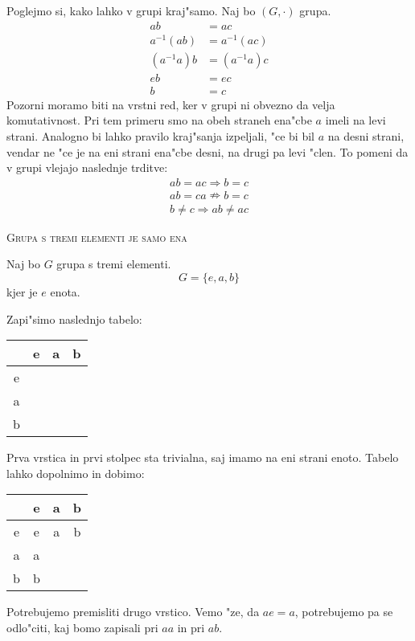Poglejmo si, kako lahko v grupi kraj"samo. Naj bo $(G, \cdot)$ grupa.
\begin{align*}
ab &= ac\\
a^{-1} (ab) &= a^{-1} (ac)\\
(a^{-1} a) b &= (a^{-1} a) c\\
eb &= ec \\
b &= c
\end{align*}
Pozorni moramo biti na vrstni red, ker v grupi ni obvezno da velja komutativnost. Pri tem primeru smo na obeh straneh ena"cbe $a$ imeli na levi strani. Analogno bi lahko pravilo kraj"sanja izpeljali, "ce bi bil $a$ na desni strani, vendar ne "ce je na eni strani ena"cbe desni, na drugi pa levi "clen. To pomeni da v grupi vlejajo naslednje trditve:
\begin{gather*}
ab = ac \Rightarrow b = c \\
ab = ca \nRightarrow b = c \\
b \neq c \Rightarrow ab \neq ac
\end{gather*}

\textsc{Grupa s tremi elementi je samo ena}

Naj bo $G$ grupa s tremi elementi.
\begin{equation*}
G = \{e, a, b\}
\end{equation*}
kjer je $e$ enota.

Zapi"simo naslednjo tabelo:
\begin{table}[!htbp]
	\centering
	\begin{tabular}{c|ccc}
		& e & a & b \\ \hline
		e &  &  & \\
		a &  &  &  \\
		b &  &  & 
	\end{tabular}
\end{table}

Prva vrstica in prvi stolpec sta trivialna, saj imamo na eni strani enoto. Tabelo lahko dopolnimo in dobimo:
\begin{table}[!htbp]
	\centering
	\begin{tabular}{c|ccc}
		& e & a & b \\ \hline
		e & e & a & b\\
		a & a &  &  \\
		b & b &  & 
	\end{tabular}
\end{table}

 Potrebujemo premisliti drugo vrstico. Vemo "ze, da $ae = a$, potrebujemo pa se odlo"citi, kaj bomo zapisali pri $aa$ in pri $ab$.


